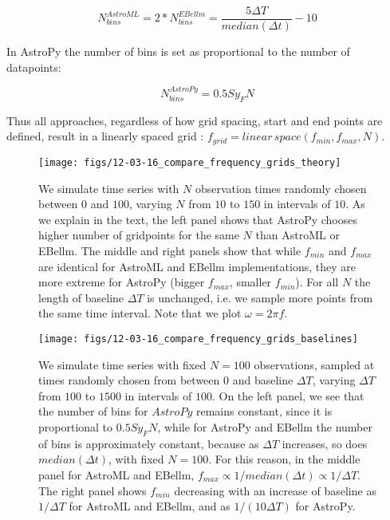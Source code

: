 \documentclass[fleqn,usenatbib]{mnras}  %
\begin{document}
\begin{equation}
N_{bins}^{AstroML} = 2 * N_{bins}^{EBellm} = \frac{5 \Delta T }{median(\Delta t)} - 10 
\end{equation}

In AstroPy the number of bins is set as proportional to the number of datapoints: 

\begin{equation}
N_{bins}^{AstroPy} = 0.5 S y_{F} N 
\end{equation}

Thus all approaches, regardless of how grid spacing, start and end points are defined, result in a linearly spaced grid :  $f_{grid} = linear \, space(f_{min}, f_{max}, N)$. 



\begin{figure*}
  \texttt{[image: figs/12-03-16\_compare\_frequency\_grids\_theory]}
  \caption{We simulate time series with $N$ observation times randomly chosen between $0$ and $100$,  varying $N$ from $10$ to $150$ in intervals of $10$. As we explain in the text, the left panel shows that AstroPy chooses higher number of gridpoints for the same $N$ than AstroML or EBellm.  The middle  and right panels show that while $f_{min}$ and $f_{max}$ are identical for  AstroML and EBellm implementations,  they are more extreme for AstroPy (bigger $f_{max}$, smaller $f_{min}$). For all $N$ the length of baseline $\Delta T$ is unchanged, i.e. we sample more points from the same time interval. Note that we plot $\omega = 2 \pi f $. }
  \label{fig:frequency_grids}
\end{figure*}


\begin{figure*}
  \texttt{[image: figs/12-03-16\_compare\_frequency\_grids\_baselines]}
  \caption{We simulate time series with fixed $N=100$ observations, sampled at times randomly chosen from between $0$ and baseline $\Delta T$, varying $\Delta T $ from $100$ to $1500$ in intervals of $100$.  On the left panel, we see that the number of bins for $AstroPy$ remains constant, since it is proportional to $0.5 S y_{F} N$, while  for AstroPy and EBellm the number of bins is approximately constant, because as $\Delta T$ increases, so does $median(\Delta t)$, with fixed $N=100$. For this reason, in the middle panel for AstroML and EBellm, $f_{max} \propto 1 / median(\Delta t) \propto 1 / \Delta T $. The right panel shows $f_{min}$ decreasing with an increase of baseline as $1/ \Delta T$ for AstroML and EBellm, and as $1 / (10 \Delta T)$ for AstroPy.}
  \label{fig:frequency_grids_baselines}
\end{figure*}
\end{document}

